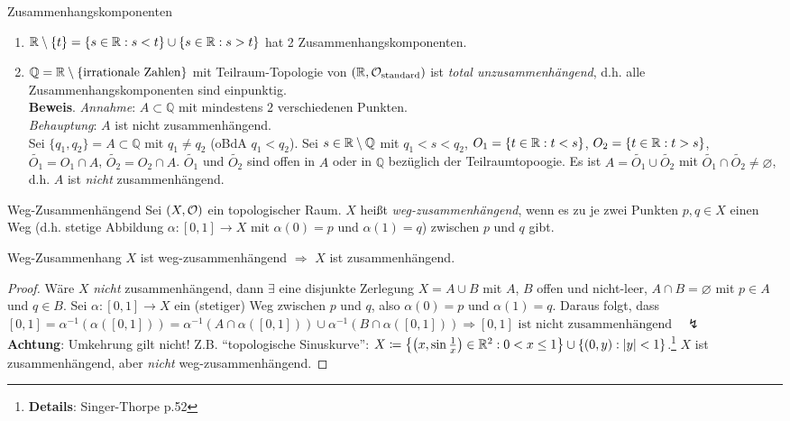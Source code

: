 \begin{example}{Zusammenhangskomponenten}
  \begin{enumerate}
    \item $ \mathbb{R} \setminus \{ t \} = \{ s \in \mathbb{R} : s < t \} \cup \{ s \in \mathbb{R} : s > t \} $ hat 2 Zusammenhangskomponenten.
    \item $ \mathbb{Q} = \mathbb{R} \setminus \{ \text{irrationale Zahlen} \} $ mit Teilraum-Topologie von $ (\mathbb{R}, \mathcal{O}_\text{standard}) $ ist \emph{total unzusammenhängend}, d.h. alle Zusammenhangskomponenten sind einpunktig. \\
    \textbf{Beweis}. \emph{Annahme}: $ A \subset \mathbb{Q} $ mit mindestens $ 2 $ verschiedenen Punkten. \\
    \emph{Behauptung}: $ A $ ist nicht zusammenhängend. \\
    Sei $ \{ q_1, q_2 \} = A \subset \mathbb{Q} $ mit $ q_1 \neq q_2 $ (oBdA $ q_1 < q_2 $). Sei $ s \in \mathbb{R} \setminus \mathbb{Q} $ mit $ q_1 < s < q_2 $, $ O_1 = \{ t \in \mathbb{R}: t < s \} $, $ O_2 = \{ t \in \mathbb{R} : t > s \} $, $ \widetilde{O_1} = O_1 \cap A $, $ \widetilde{O_2} = O_2 \cap A $. $ \widetilde{O_1} $ und $ \widetilde{O_2} $ sind offen in $ A $ oder in $ \mathbb{Q} $ bezüglich der Teilraumtopoogie. Es ist $ A = \widetilde{O_1} \cup \widetilde{O_2} $ mit $ \widetilde{O_1} \cap \widetilde{O_2} \neq \varnothing $, d.h. $ A $ ist \emph{nicht} zusammenhängend.
  \end{enumerate}
\end{example}

\begin{definition}{Weg-Zusammenhängend}
  Sei $ (X, \mathcal{O}) $ ein topologischer Raum. $ X $ heißt \emph{weg-zusammenhängend}, wenn es zu je zwei Punkten $ p, q \in X $ einen Weg (d.h. stetige Abbildung $ \alpha : [0,1] \to X $ mit $ \alpha(0) = p $ und $ \alpha(1) = q $) zwischen $ p $ und $ q $ gibt.
\end{definition}

\begin{lemma}{Weg-Zusammenhang}
  $ X $ ist weg-zusammenhängend $ \Rightarrow $ $ X $ ist zusammenhängend.
  \begin{proof}
    Wäre $ X $ \emph{nicht} zusammenhängend, dann $ \exists $ eine disjunkte Zerlegung $ X = A \cup B $ mit $ A $, $ B $ offen und nicht-leer, $ A \cap B = \varnothing $ mit $ p \in A $ und $ q \in B $. Sei $ \alpha: [0,1] \to X $ ein (stetiger) Weg zwischen $ p $ und $ q $, also $ \alpha(0) = p $ und $ \alpha(1) = q $. Daraus folgt, dass $ [0,1] = \alpha^{-1}(\alpha([0,1])) = \alpha^{-1}(A \cap \alpha([0,1])) \cup \alpha^{-1}(B \cap \alpha([0,1])) \Rightarrow [0,1] \text{ ist nicht zusammenhängend} \quad \lightning $ \\
    \textbf{Achtung}: Umkehrung gilt nicht! Z.B. ``topologische Sinuskurve'': $ X \coloneqq \left\{ \left( x, \sin\tfrac{1}{x} \right) \in \mathbb{R}^2 : 0 < x \leq 1 \right\} \cup \{ (0,y) : \vert y \vert < 1 \} $.\footnote{\textbf{Details}: Singer-Thorpe p.52} $ X $ ist zusammenhängend, aber \emph{nicht} weg-zusammenhängend.
  \end{proof}
\end{lemma}

